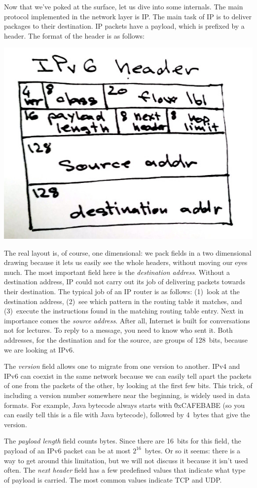 Now that we've poked at the surface, let us dive into some internals.
The main protocol implemented in the network layer is IP\null.
The main task of IP is to deliver packages to their destination.
IP packets have a payload, which is prefixed by a header.
The format of the header is as follows:
\begin{center}
\includegraphics[width=.5\textwidth]{ipv6-header.jpg}
\end{center}
The real layout is, of course, one dimensional:
  we pack fields in a two dimensional drawing
    because it lets us easily see the whole headers,
    without moving our eyes much.
The most important field here is the \emph{destination address}.
Without a destination address,
  IP could not carry out its job of delivering packets towards their destination.
The typical job of an IP router is as follows:
  (1)~look at the destination address,
  (2)~see which pattern in the routing table it matches, and
  (3)~execute the instructions found in the matching routing table entry.
Next in importance comes the \emph{source address}.
After all, Internet is built for conversations not for lectures.
To reply to a message, you need to know who sent it.
Both addresses, for the destination and for the source, are groups of 128~bits,
  because we are looking at IPv6.

The \emph{version} field allows one to migrate from one version to another.
IPv4 and IPv6 can coexist in the same network
  because we can easily tell apart the packets of one from the packets of the other,
  by looking at the first few bits.
This trick, of including a version number somewhere near the beginning,
  is widely used in data formats.
For example,
  Java bytecode always starts with \.{0xCAFEBABE}
    (so you can easily tell this is a file with Java bytecode),
  followed by 4~bytes that give the version.

The \emph{payload length} field counts bytes.
Since there are 16~bits for this field,
  the payload of an IPv6 packet can be at most $2^{16}$~bytes.
Or so it seems:
  there is a way to get around this limitation,
  but we will not discuss it because it isn't used often.
The \emph{next header} field has a few predefined values
  that indicate what type of payload is carried.
The most common values indicate TCP and UDP\null.

